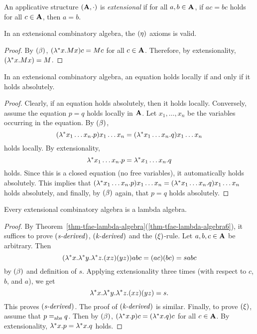 \documentclass{article}
\begin{document}
\begin{definition}
  An applicative structure $({\bf A},\cdot)$ is {\em extensional} if for all
  $a,b\in {\bf A}$, if $ac=bc$ holds for all $c\in {\bf A}$, then $a=b$.
\end{definition}

\begin{proposition}
  In an extensional combinatory algebra, the $\textrm{(\textit{$\eta$\/})}$ axioms is
  valid.
\end{proposition}

\begin{proof}
  By $\textrm{(\textit{$\beta$\/})}$, $(\lambda^*x.Mx)c = Mc$ for all $c\in{\bf A}$. Therefore, by
  extensionality, $(\lambda^*x.Mx)=M$.\eot
\end{proof}

\begin{proposition}
  In an extensional combinatory algebra, an equation holds locally if
  and only if it holds absolutely.
\end{proposition}

\begin{proof}
  Clearly, if an equation holds absolutely, then it holds locally.
  Conversely, assume the equation $p=q$ holds locally in ${\bf A}$. Let
  $x_1,\ldots,x_n$ be the variables occurring in the equation. By
  $\textrm{(\textit{$\beta$\/})}$, 
  \[(\lambda^*x_1\ldots x_n.p)x_1\ldots
  x_n=(\lambda^*x_1\ldots x_n.q)x_1\ldots x_n\] holds locally. By
  extensionality, \[\lambda^*x_1\ldots x_n.p=\lambda^*x_1\ldots x_n.q\]
  holds. Since this is a closed equation (no free variables), it
  automatically holds absolutely. This implies that $(\lambda^*x_1\ldots
  x_n.p)x_1\ldots
  x_n=(\lambda^*x_1\ldots x_n.q)x_1\ldots x_n$ holds absolutely, and
  finally, by $\textrm{(\textit{$\beta$\/})}$ again, that $p=q$ holds absolutely. \eot
\end{proof}

\begin{proposition}
  Every extensional combinatory algebra is a lambda
  algebra.
\end{proposition}

\begin{proof}
  By
  Theorem~\ref{thm-tfae-lambda-algebra}(\ref{thm-tfae-lambda-algebra6}),
  it suffices to prove $\textrm{(\textit{s-derived\/})}$, $\textrm{(\textit{k-derived\/})}$ and
  the $\textrm{(\textit{$\xi$\/})}$-rule. Let $a,b,c\in{\bf A}$ be arbitrary. Then 
  \[ (\lambda^*x.\lambda^*y.\lambda^*z.(xz)(yz))abc = (ac)(bc) = sabc 
  \]
  by $\textrm{(\textit{$\beta$\/})}$ and definition of $s$. Applying extensionality three
  times (with respect to $c$, $b$, and $a$), we get
  \[ \lambda^*x.\lambda^*y.\lambda^*z.(xz)(yz) = s.
  \]
  This proves $\textrm{(\textit{s-derived\/})}$. The proof of $\textrm{(\textit{k-derived\/})}$ is
  similar. Finally, to prove $\textrm{(\textit{$\xi$\/})}$, assume that $p=_{\rm abs} q$.
  Then by $\textrm{(\textit{$\beta$\/})}$, $(\lambda^*x.p)c=(\lambda^*x.q)c$ for all
  $c\in{\bf A}$. By extensionality, $\lambda^*x.p=\lambda^*x.q$ holds.\eot
\end{proof}
\end{document}
